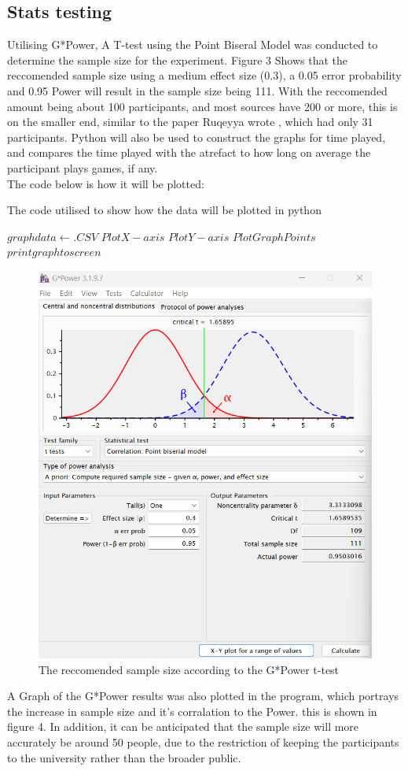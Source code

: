 \documentclass[conference]{IEEEtran}
\begin{document}
\subsection{Stats testing}
Utilising G*Power, A T-test using the Point Biseral Model was conducted to determine the sample size for the experiment. Figure 3 Shows that the reccomended sample size using a medium effect size (0.3), a 0.05 error probability and 0.95 Power will result in the sample size being 111.  With the reccomended amount being about 100 participants, and most sources have 200 or more, this is on the smaller end, similar to the paper Ruqeyya wrote \cite{Ruqeyya2022}, which had only 31 participants.  Python will also be used to construct the graphs for time played, and compares the time played with the atrefact to how long on average the participant plays games, if any.\\

The code below is how it will be plotted:
\begin{algorithm}
\caption{The code utilised to show how the data will be plotted in python}
\begin{algorithmic}
\STATE $ graph data \gets .CSV $
	\STATE $Plot X-axis$
	\STATE $Plot Y-axis$
	\STATE $Plot Graph Points$
\ENDFOR
\STATE $printgraphtoscreen$
\end{algorithmic}
\end{algorithm}

\begin{figure}[H]
\includegraphics[width =0.5 \textwidth]{fig1(2)}
\caption{The reccomended sample size according to the G*Power t-test}
\end{figure}

A Graph of the G*Power results was also plotted in the program, which portrays the increase in sample size and it's corralation to the Power. this is shown in figure 4. In addition, it can be anticipated that the sample size will more accurately be around 50 people, due to the restriction of keeping the participants to the university rather than the broader public. 
\end{document}
